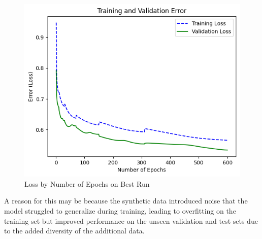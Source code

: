 \begin{figure}[thpb]
    \centering
    \includegraphics[scale=0.4]{img/loss.png}
    \caption{Loss by Number of Epochs on Best Run}
\end{figure}

A reason for this may
be because the synthetic data introduced noise that the model struggled to generalize during training, leading to overfitting on the 
training set but improved performance on the unseen validation and test sets due to the added diversity of the additional data.
